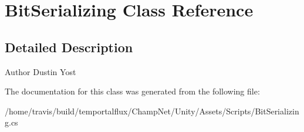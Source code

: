 \hypertarget{class_bit_serializing}{\section{Bit\-Serializing Class Reference}
\label{class_bit_serializing}
}


\subsection{Detailed Description}
\begin{DoxyAuthor}{Author}
Dustin Yost 
\end{DoxyAuthor}


The documentation for this class was generated from the following file\-:\begin{DoxyCompactItemize}
\item 
/home/travis/build/temportalflux/\-Champ\-Net/\-Unity/\-Assets/\-Scripts/Bit\-Serializing.\-cs\end{DoxyCompactItemize}
